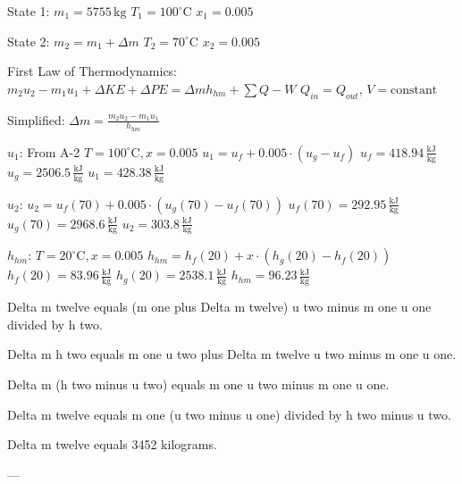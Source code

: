 State 1:  
\( m_1 = 5755 \, \text{kg} \)  
\( T_1 = 100^\circ \text{C} \)  
\( x_1 = 0.005 \)  

State 2:  
\( m_2 = m_1 + \Delta m \)  
\( T_2 = 70^\circ \text{C} \)  
\( x_2 = 0.005 \)  

First Law of Thermodynamics:  
\( m_2 u_2 - m_1 u_1 + \Delta KE + \Delta PE = \Delta m h_{hm} + \sum Q - W \)  
\( Q_{in} = Q_{out} \), \( V = \text{constant} \)  

Simplified:  
\( \Delta m = \frac{m_2 u_2 - m_1 u_1}{h_{hm}} \)  

\( u_1 \): From A-2  
\( T = 100^\circ \text{C}, x = 0.005 \)  
\( u_1 = u_f + 0.005 \cdot (u_g - u_f) \)  
\( u_f = 418.94 \, \frac{\text{kJ}}{\text{kg}} \)  
\( u_g = 2506.5 \, \frac{\text{kJ}}{\text{kg}} \)  
\( u_1 = 428.38 \, \frac{\text{kJ}}{\text{kg}} \)  

\( u_2 \):  
\( u_2 = u_f(70) + 0.005 \cdot (u_g(70) - u_f(70)) \)  
\( u_f(70) = 292.95 \, \frac{\text{kJ}}{\text{kg}} \)  
\( u_g(70) = 2968.6 \, \frac{\text{kJ}}{\text{kg}} \)  
\( u_2 = 303.8 \, \frac{\text{kJ}}{\text{kg}} \)  

\( h_{hm} \):  
\( T = 20^\circ \text{C}, x = 0.005 \)  
\( h_{hm} = h_f(20) + x \cdot (h_g(20) - h_f(20)) \)  
\( h_f(20) = 83.96 \, \frac{\text{kJ}}{\text{kg}} \)  
\( h_g(20) = 2538.1 \, \frac{\text{kJ}}{\text{kg}} \)  
\( h_{hm} = 96.23 \, \frac{\text{kJ}}{\text{kg}} \)

Delta m twelve equals (m one plus Delta m twelve) u two minus m one u one divided by h two.  

Delta m h two equals m one u two plus Delta m twelve u two minus m one u one.  

Delta m (h two minus u two) equals m one u two minus m one u one.  

Delta m twelve equals m one (u two minus u one) divided by h two minus u two.  

Delta m twelve equals 3452 kilograms.  

---